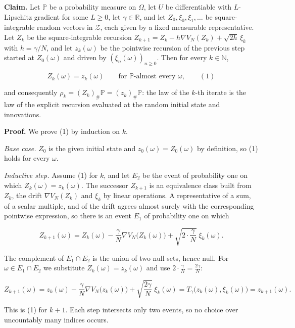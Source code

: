 \documentclass[11pt,a4paper]{report}
\begin{document}
\textbf{Claim.} Let \(\mathbb P\) be a probability measure on \(\Omega\), let \(U\) be differentiable with \(L\)-Lipschitz gradient for some \(L\ge0\), let \(\gamma\in\mathbb R\), and let \(Z_0,\xi_0,\xi_1,\dots\) be square-integrable random vectors in \(\mathcal Z\), each given by a fixed measurable representative. Let \(Z_k\) be the square-integrable recursion \(Z_{k+1}=Z_k-h\nabla V_N(Z_k)+\sqrt{2h}\,\xi_k\) with \(h=\gamma/N\), and let \(z_k(\omega)\) be the pointwise recursion of the previous step started at \(Z_0(\omega)\) and driven by \((\xi_n(\omega))_{n\ge0}\). Then for every \(k\in\mathbb N\),


\[Z_k(\omega)=z_k(\omega)\qquad\text{for }\mathbb P\text{-almost every }\omega,\qquad(1)\]


and consequently \(\rho_k=(Z_k)_\#\mathbb P=(z_k)_\#\mathbb P\): the law of the \(k\)-th iterate is the law of the explicit recursion evaluated at the random initial state and innovations.




\textbf{Proof.} We prove (1) by induction on \(k\).




\emph{Base case.} \(Z_0\) is the given initial state and \(z_0(\omega)=Z_0(\omega)\) by definition, so (1) holds for every \(\omega\).




\emph{Inductive step.} Assume (1) for \(k\), and let \(E_2\) be the event of probability one on which \(Z_k(\omega)=z_k(\omega)\). The successor \(Z_{k+1}\) is an equivalence class built from \(Z_k\), the drift \(\nabla V_N(Z_k)\) and \(\xi_k\) by linear operations. A representative of a sum, of a scalar multiple, and of the drift agrees almost surely with the corresponding pointwise expression, so there is an event \(E_1\) of probability one on which


\[Z_{k+1}(\omega)=Z_k(\omega)-\frac\gamma N\nabla V_N\bigl(Z_k(\omega)\bigr)+\sqrt{2\cdot\frac\gamma N}\;\xi_k(\omega).\]


The complement of \(E_1\cap E_2\) is the union of two null sets, hence null. For \(\omega\in E_1\cap E_2\) we substitute \(Z_k(\omega)=z_k(\omega)\) and use \(2\cdot\frac\gamma N=\frac{2\gamma}N\):


\[Z_{k+1}(\omega)=z_k(\omega)-\frac\gamma N\nabla V_N\bigl(z_k(\omega)\bigr)+\sqrt{\frac{2\gamma}N}\;\xi_k(\omega)=T_\gamma\bigl(z_k(\omega),\xi_k(\omega)\bigr)=z_{k+1}(\omega).\]


This is (1) for \(k+1\). Each step intersects only two events, so no choice over uncountably many indices occurs.
\end{document}
